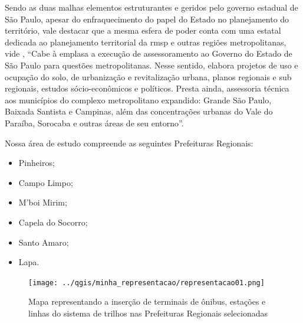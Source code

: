 	Sendo as duas malhas elementos estruturantes e geridos pelo governo estadual de São Paulo, apesar do enfraquecimento do papel do Estado no planejamento do território, vale destacar que a mesma esfera de poder conta com uma estatal dedicada ao planejamento territorial da \gls{rmsp} e outras regiões metropolitanas, vide , ``Cabe à \gls{emplasa} a execução de assessoramento ao Governo do Estado de São Paulo para questões metropolitanas. Nesse sentido, elabora projetos de uso e ocupação do solo, de urbanização e revitalização urbana, planos regionais e sub regionais, estudos sócio-econômicos e políticos. Presta ainda, assessoria técnica aos municípios do complexo metropolitano expandido: Grande São Paulo, Baixada Santista e Campinas, além das concentrações urbanas do Vale do Paraíba, Sorocaba e outras áreas de seu entorno''.
	
	Nossa área de estudo compreende as seguintes Prefeituras Regionais:
	\begin{itemize}
		\item Pinheiros;
		\item Campo Limpo;
		\item M'boi Mirim;
		\item Capela do Socorro;
		\item Santo Amaro;
		\item Lapa.
	\end{itemize}
	
	
	\begin{figure}[p!]
		\caption{Mapa representando a inserção de terminais de ônibus, estações e linhas do sistema de trilhos nas Prefeituras Regionais selecionadas}
		\texttt{[image: ../qgis/minha\_representacao/representacao01.png]}
	\end{figure}

